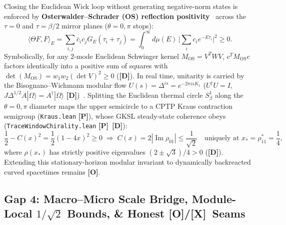 \documentclass[11pt,a4paper]{article}
\newcommand{\badgeP}{\textbf{\color{sqJade}[P]}}
\newcommand{\badgeD}{\textbf{\color{sqRose}[D]}}
\newcommand{\badgeO}{\textbf{\color{sqAmber}[O]}}
\newcommand{\badgeX}{\textbf{\color{sqKilled}[X]}}
\theoremstyle{definition}
\begin{document}
Closing the Euclidean Wick loop without generating negative-norm states is enforced by \textbf{Osterwalder--Schrader (OS) reflection positivity}~\cite{OsterwalderSchrader1975} across the $\tau=0$ and $\tau=\beta/2$ mirror planes ($\theta=0,\pi$ stops):
\begin{equation}
  \langle \Theta F, F \rangle_E = \sum_{i,j} \bar{c}_i c_j G_E(\tau_i + \tau_j) = \int_0^\infty d\mu(E)\,\Big|\sum_i c_i e^{-E\tau_i}\Big|^2 \ge 0.
\end{equation}
Symbolically, for any 2-mode Euclidean Schwinger kernel $M_{\mathrm{OS}} = V^T W V$, $c^T M_{\mathrm{OS}} c$ factors identically into a positive sum of squares with $\det(M_{\mathrm{OS}}) = w_1 w_2 (\det V)^2 \ge 0$ (\badgeD). In real time, unitarity is carried by the Bisognano--Wichmann modular flow $U(s) = \Delta^{is} = e^{-2\pi i s K_1}$ ($U^\dagger U = I$, $J\Delta^{1/2}A|\Omega\rangle = A^\dagger|\Omega\rangle$ \badgeD)~\cite{BisognanoWichmann1975}. Splitting the Euclidean thermal circle $S^1_\beta$ along the $\theta=0,\pi$ diameter maps the upper semicircle to a CPTP Kraus contraction semigroup (\texttt{Kraus.lean} \badgeP), whose GKSL steady-state coherence obeys (\texttt{TraceWindowChirality.lean} \badgeP\ \badgeD):
\begin{equation}
  \frac{1}{2} - C(x)^2 = \frac{1}{2}(1 - 4x)^2 \ge 0 \;\Longrightarrow\; C(x) = 2|\operatorname{Im}\rho_{01}| \le \frac{1}{\sqrt{2}} \quad \text{uniquely at } x_* = \rho_{11}^* = \frac{1}{4},
\end{equation}
where $\rho(x_*)$ has strictly positive eigenvalues $(2\pm\sqrt{3})/4 > 0$ (\badgeD). Extending this stationary-horizon modular invariant to dynamically backreacted curved spacetimes remains \badgeO.

\subsection{Gap 4: Macro--Micro Scale Bridge, Module-Local $1/\sqrt{2}$ Bounds, \& Honest \badgeO/\badgeX\ Seams}
\end{document}
